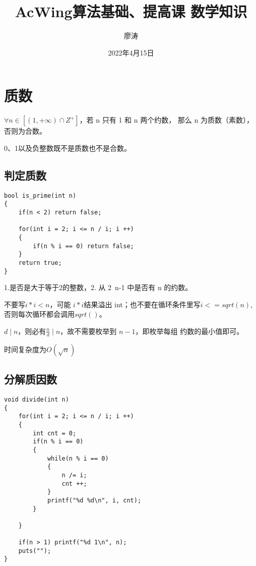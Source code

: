\documentclass[]{book}
\title{AcWing算法基础、提高课 数学知识}
\author{廖涛}
\date{2022年4月15日}
\begin{document}


\maketitle
\tableofcontents

\chapter{质数}
$\forall n\in [(1, +\infty) \cap Z^+]$，若 n 只有 1 和 n 两个约数，
那么 n 为质数（素数），否则为合数。

0、1以及负整数既不是质数也不是合数。

\section{判定质数}
\begin{lstlisting}
bool is_prime(int n)
{
    if(n < 2) return false;

    for(int i = 2; i <= n / i; i ++)
    {
        if(n % i == 0) return false;
    }
    return true;
}
\end{lstlisting}

1.是否是大于等于2的整数，2. 从 2~n-1 中是否有 n 的约数。

不要写$i*i<n$，可能 $i*i$结果溢出 int；也不要在循环条件里写$i<=sqrt(n)$,
否则每次循环都会调用$sqrt()$。

$d \mid n$，则必有$\frac{n}{d} \mid n$，故不需要枚举到 $n - 1$，即枚举每组
约数的最小值即可。

时间复杂度为$O(\sqrt{n})$

\section{分解质因数}
\begin{lstlisting}
void divide(int n)
{
    for(int i = 2; i <= n / i; i ++)
    {   
        int cnt = 0;
        if(n % i == 0)
        {
            while(n % i == 0)
            {
                n /= i;
                cnt ++;
            }
            printf("%d %d\n", i, cnt);
        }
        
    }
    
    if(n > 1) printf("%d 1\n", n);
    puts("");
}
\end{lstlisting}
\end{document}
